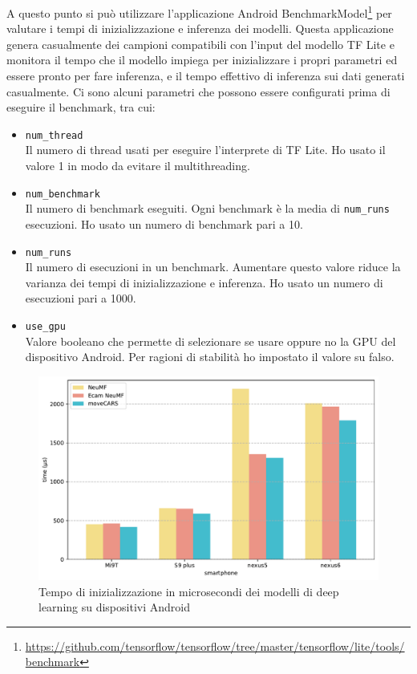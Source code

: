 \documentclass[12pt,italian]{report}
\begin{document}
\noindent A questo punto si può utilizzare l'applicazione Android BenchmarkModel\footnote{\url{https://github.com/tensorflow/tensorflow/tree/master/tensorflow/lite/tools/benchmark}} per valutare i tempi di inizializzazione e inferenza dei modelli. Questa applicazione genera casualmente dei campioni compatibili con l'input del modello TF Lite e monitora il tempo che il modello impiega per inizializzare i propri parametri ed essere pronto per fare inferenza, e il tempo effettivo di inferenza sui dati generati casualmente. Ci sono alcuni parametri che possono essere configurati prima di eseguire il benchmark, tra cui:
\begin{itemize}
\item \texttt{num\_thread} \\ Il numero di thread usati per eseguire l'interprete di TF Lite. Ho usato il valore 1 in modo da evitare il multithreading.
\item \texttt{num\_benchmark} \\ Il numero di benchmark eseguiti. Ogni benchmark è la media di \texttt{num\_runs} esecuzioni. Ho usato un numero di benchmark pari a 10.
\item \texttt{num\_runs} \\ Il numero di esecuzioni in un benchmark. Aumentare questo valore riduce la varianza dei tempi di inizializzazione e inferenza. Ho usato un numero di esecuzioni pari a 1000.
\item \texttt{use\_gpu} \\ Valore booleano che permette di selezionare se usare oppure no la GPU del dispositivo Android. Per ragioni di stabilità ho impostato il valore su falso.
\end{itemize}

\begin{figure}
  \centering
  \includegraphics[width=\linewidth]{immagini/init_tflite.pdf}
  \caption{Tempo di inizializzazione in microsecondi dei modelli di deep learning su dispositivi Android}
  \label{fig:init-time}
\end{figure}
\end{document}
